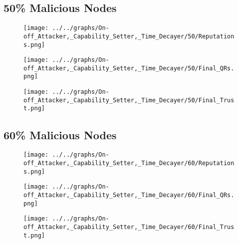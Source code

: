 \begin{minipage}[t]{0.49\columnwidth}
\subsection*{50\% Malicious Nodes}
    \begin{figure}[H]
        \centering
        \texttt{[image: ../../graphs/On-off\_Attacker,\_Capability\_Setter,\_Time\_Decayer/50/Reputations.png]}
    \end{figure}
    \begin{figure}[H]
        \centering
        \texttt{[image: ../../graphs/On-off\_Attacker,\_Capability\_Setter,\_Time\_Decayer/50/Final\_QRs.png]}
    \end{figure}
\end{minipage}
\begin{minipage}[t]{0.49\columnwidth}
    \begin{figure}[H]
        \centering
        \texttt{[image: ../../graphs/On-off\_Attacker,\_Capability\_Setter,\_Time\_Decayer/50/Final\_Trust.png]}
    \end{figure}
\end{minipage}

\begin{minipage}[t]{0.49\columnwidth}
\subsection*{60\% Malicious Nodes}
    \begin{figure}[H]
        \centering
        \texttt{[image: ../../graphs/On-off\_Attacker,\_Capability\_Setter,\_Time\_Decayer/60/Reputations.png]}
    \end{figure}
    \begin{figure}[H]
        \centering
        \texttt{[image: ../../graphs/On-off\_Attacker,\_Capability\_Setter,\_Time\_Decayer/60/Final\_QRs.png]}
    \end{figure}
\end{minipage}
\begin{minipage}[t]{0.49\columnwidth}
    \begin{figure}[H]
        \centering
        \texttt{[image: ../../graphs/On-off\_Attacker,\_Capability\_Setter,\_Time\_Decayer/60/Final\_Trust.png]}
    \end{figure}
\end{minipage}

